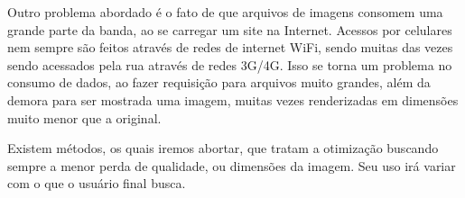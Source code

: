 Outro problema abordado é o fato de que arquivos de imagens consomem uma grande parte da banda, ao se carregar um site na Internet. Acessos por celulares nem sempre são feitos através de redes de internet WiFi, sendo muitas das vezes sendo acessados pela rua através de redes 3G/4G. Isso se torna um problema no consumo de dados, ao fazer requisição para arquivos muito grandes, além da demora para ser mostrada uma imagem, muitas vezes renderizadas em dimensões muito menor que a original.

Existem métodos, os quais iremos abortar, que tratam a otimização buscando sempre a menor perda de qualidade, ou dimensões da imagem. Seu uso irá variar com o que o usuário final busca.
